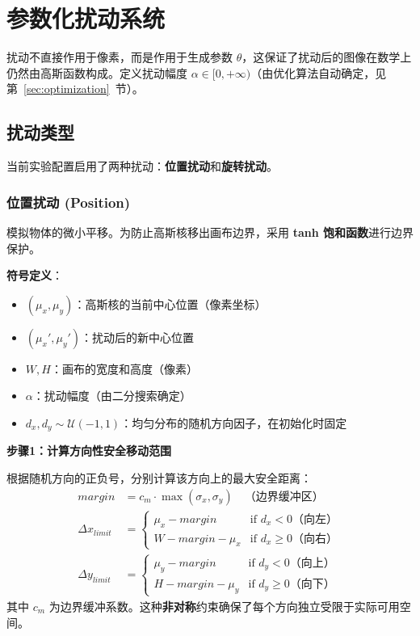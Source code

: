 \documentclass{article}
\begin{document}
\section{参数化扰动系统}
扰动不直接作用于像素，而是作用于生成参数 $\theta$，这保证了扰动后的图像在数学上仍然由高斯函数构成。定义扰动幅度 $\alpha \in [0, +\infty)$（由优化算法自动确定，见第~\ref{sec:optimization}~节）。

\subsection{扰动类型}
当前实验配置启用了两种扰动：\textbf{位置扰动}和\textbf{旋转扰动}。

\subsubsection{位置扰动 (Position)}
模拟物体的微小平移。为防止高斯核移出画布边界，采用 \textbf{tanh 饱和函数}进行边界保护。

\textbf{符号定义}：
\begin{itemize}
    \item $(\mu_x, \mu_y)$：高斯核的当前中心位置（像素坐标）
    \item $(\mu_x', \mu_y')$：扰动后的新中心位置
    \item $W, H$：画布的宽度和高度（像素）
    \item $\alpha$：扰动幅度（由二分搜索确定）
    \item $d_x, d_y \sim \mathcal{U}(-1, 1)$：均匀分布的随机方向因子，在初始化时固定
\end{itemize}

\textbf{步骤1：计算方向性安全移动范围}

根据随机方向的正负号，分别计算该方向上的最大安全距离：
\begin{align}
margin &= c_m \cdot \max(\sigma_x, \sigma_y) \quad \text{（边界缓冲区）} \\
\Delta x_{limit} &= \begin{cases} \mu_x - margin & \text{if } d_x < 0 \text{（向左）} \\ W - margin - \mu_x & \text{if } d_x \geq 0 \text{（向右）} \end{cases} \\
\Delta y_{limit} &= \begin{cases} \mu_y - margin & \text{if } d_y < 0 \text{（向上）} \\ H - margin - \mu_y & \text{if } d_y \geq 0 \text{（向下）} \end{cases}
\end{align}
其中 $c_m$ 为边界缓冲系数。这种\textbf{非对称}约束确保了每个方向独立受限于实际可用空间。
\end{document}
